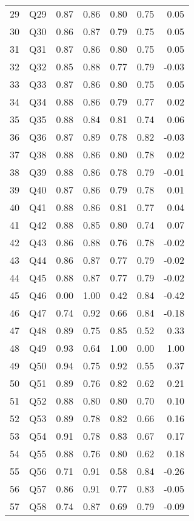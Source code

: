 \documentclass{amsart}
\begin{document}
\begin{longtable}{rlrrrrr}
  29 & Q29 & 0.87 & 0.86 & 0.80 & 0.75 & 0.05 \\ 
  30 & Q30 & 0.86 & 0.87 & 0.79 & 0.75 & 0.05 \\ 
  31 & Q31 & 0.87 & 0.86 & 0.80 & 0.75 & 0.05 \\ 
  32 & Q32 & 0.85 & 0.88 & 0.77 & 0.79 & -0.03 \\ 
  33 & Q33 & 0.87 & 0.86 & 0.80 & 0.75 & 0.05 \\ 
  34 & Q34 & 0.88 & 0.86 & 0.79 & 0.77 & 0.02 \\ 
  35 & Q35 & 0.88 & 0.84 & 0.81 & 0.74 & 0.06 \\ 
  36 & Q36 & 0.87 & 0.89 & 0.78 & 0.82 & -0.03 \\ 
  37 & Q38 & 0.88 & 0.86 & 0.80 & 0.78 & 0.02 \\ 
  38 & Q39 & 0.88 & 0.86 & 0.78 & 0.79 & -0.01 \\ 
  39 & Q40 & 0.87 & 0.86 & 0.79 & 0.78 & 0.01 \\ 
  40 & Q41 & 0.88 & 0.86 & 0.81 & 0.77 & 0.04 \\ 
  41 & Q42 & 0.88 & 0.85 & 0.80 & 0.74 & 0.07 \\ 
  42 & Q43 & 0.86 & 0.88 & 0.76 & 0.78 & -0.02 \\ 
  43 & Q44 & 0.86 & 0.87 & 0.77 & 0.79 & -0.02 \\ 
  44 & Q45 & 0.88 & 0.87 & 0.77 & 0.79 & -0.02 \\ 
  45 & Q46 & 0.00 & 1.00 & 0.42 & 0.84 & -0.42 \\ 
  46 & Q47 & 0.74 & 0.92 & 0.66 & 0.84 & -0.18 \\ 
  47 & Q48 & 0.89 & 0.75 & 0.85 & 0.52 & 0.33 \\ 
  48 & Q49 & 0.93 & 0.64 & 1.00 & 0.00 & 1.00 \\ 
  49 & Q50 & 0.94 & 0.75 & 0.92 & 0.55 & 0.37 \\ 
  50 & Q51 & 0.89 & 0.76 & 0.82 & 0.62 & 0.21 \\ 
  51 & Q52 & 0.88 & 0.80 & 0.80 & 0.70 & 0.10 \\ 
  52 & Q53 & 0.89 & 0.78 & 0.82 & 0.66 & 0.16 \\ 
  53 & Q54 & 0.91 & 0.78 & 0.83 & 0.67 & 0.17 \\ 
  54 & Q55 & 0.88 & 0.76 & 0.80 & 0.62 & 0.18 \\ 
  55 & Q56 & 0.71 & 0.91 & 0.58 & 0.84 & -0.26 \\ 
  56 & Q57 & 0.86 & 0.91 & 0.77 & 0.83 & -0.05 \\ 
  57 & Q58 & 0.74 & 0.87 & 0.69 & 0.79 & -0.09 \\ 

\end{longtable}
\end{document}
